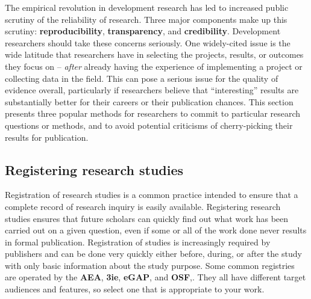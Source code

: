 The empirical revolution in development research\cite{angrist2017economic}
has led to increased public scrutiny of the reliability of research.\cite{rogers_2017}
Three major components make up this scrutiny: \textbf{reproducibility},\cite{duvendack2017meant} \textbf{transparency},\cite{christensen2018transparency} and \textbf{credibility}.\cite{ioannidis2017power}
Development researchers should take these concerns seriously.
One widely-cited issue is the wide latitude that researchers have
in selecting the projects, results, or outcomes they focus on --
\textit{after} already having the experience of implementing a project
or collecting data in the field.
This can pose a serious issue for the quality of evidence overall,
particularly if researchers believe that ``interesting'' results
are substantially better for their careers or their publication chances.
This section presents three popular methods
for researchers to commit to particular research questions or methods,
and to avoid potential criticisms of cherry-picking their results for publication.

\subsection{Registering research studies}

Registration of research studies is a common practice
intended to ensure that a complete record of research inquiry is easily available.
Registering research studies ensures that future scholars can quickly
find out what work has been carried out on a given question,
even if some or all of the work done never results in formal publication.
Registration of studies is increasingly required by publishers
and can be done very quickly either before, during, or after the study
with only basic information about the study purpose.
Some common registries are operated by the \textbf{AEA},
\textbf{3ie},
\textbf{eGAP},
and \textbf{OSF},.
They all have different target audiences and features,
so select one that is appropriate to your work.

